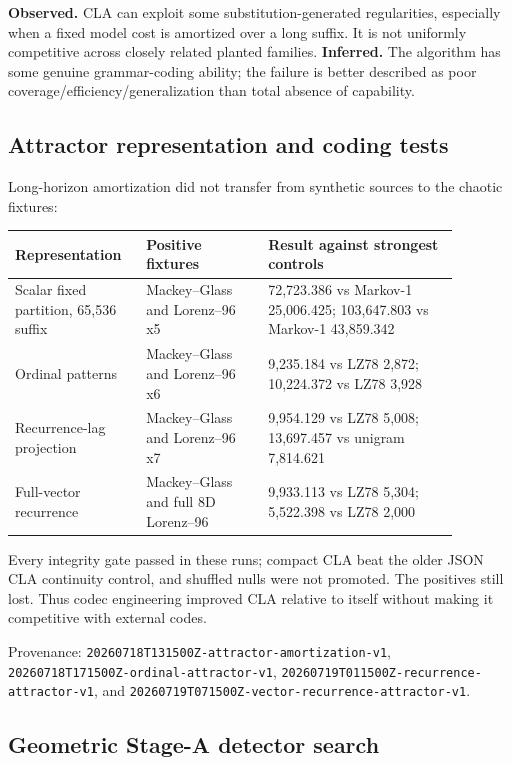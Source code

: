 \documentclass[10pt]{article}
\newcommand{\obs}{\textbf{Observed.}}
\newcommand{\inferd}{\textbf{Inferred.}}
\begin{document}
\obs{} CLA can exploit some substitution-generated regularities, especially
when a fixed model cost is amortized over a long suffix. It is not uniformly
competitive across closely related planted families. \inferd{} The algorithm has
some genuine grammar-coding ability; the failure is better described as poor
coverage/efficiency/generalization than total absence of capability.

\subsection{Attractor representation and coding tests}

Long-horizon amortization did not transfer from synthetic sources to the
chaotic fixtures:

\begin{longtable}{p{0.24\linewidth}p{0.25\linewidth}p{0.39\linewidth}}
\toprule
Representation & Positive fixtures & Result against strongest controls \\
\midrule
\endhead
Scalar fixed partition, 65,536 suffix & Mackey--Glass and Lorenz--96 x5 &
72,723.386 vs Markov-1 25,006.425; 103,647.803 vs Markov-1 43,859.342 \\
Ordinal patterns & Mackey--Glass and Lorenz--96 x6 &
9,235.184 vs LZ78 2,872; 10,224.372 vs LZ78 3,928 \\
Recurrence-lag projection & Mackey--Glass and Lorenz--96 x7 &
9,954.129 vs LZ78 5,008; 13,697.457 vs unigram 7,814.621 \\
Full-vector recurrence & Mackey--Glass and full 8D Lorenz--96 &
9,933.113 vs LZ78 5,304; 5,522.398 vs LZ78 2,000 \\
\bottomrule
\end{longtable}

Every integrity gate passed in these runs; compact CLA beat the older JSON CLA
continuity control, and shuffled nulls were not promoted. The positives still
lost. Thus codec engineering improved CLA relative to itself without making
it competitive with external codes.

Provenance:
\texttt{20260718T131500Z-attractor-amortization-v1},
\texttt{20260718T171500Z-ordinal-attractor-v1},
\texttt{20260719T011500Z-recurrence-attractor-v1}, and
\texttt{20260719T071500Z-vector-recurrence-attractor-v1}.

\subsection{Geometric Stage-A detector search}
\end{document}
